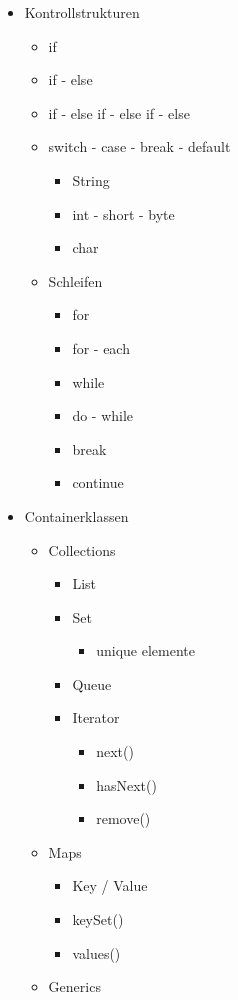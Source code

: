 \begin{itemize}
    \item Kontrollstrukturen
    \begin{itemize}
        \item if
        \item if - else
        \item if - else if - else if - else
        \item switch - case - break - default
        \begin{itemize}
            \item String
            \item int - short - byte
            \item char
        \end{itemize}
        \item Schleifen
        \begin{itemize}
            \item for
            \item for - each
            \item while
            \item do - while
            \item break
            \item continue
        \end{itemize}
    \end{itemize}
    
    \item Containerklassen
    \begin{itemize}
        \item Collections
        \begin{itemize}
            \item List
            \item Set
            \begin{itemize}
                \item unique elemente
            \end{itemize}
            \item Queue
            \item Iterator
            \begin{itemize}
                \item next()
                \item hasNext()
                \item remove()
            \end{itemize}
        \end{itemize}
        \item Maps
        \begin{itemize}
            \item Key / Value
            \item keySet()
            \item values()
        \end{itemize}
        \item Generics
    \end{itemize}
    

\end{itemize}
